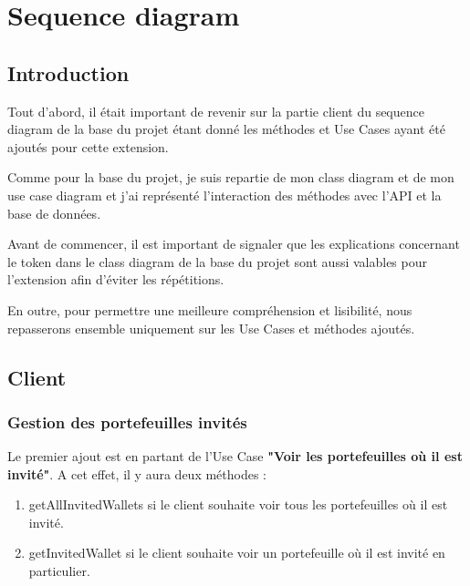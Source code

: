 \section{Sequence diagram}
\subsection{Introduction}

\begin{flushleft}
Tout d'abord, il était important de revenir sur la partie client du sequence diagram de la base du projet étant donné les méthodes et Use Cases ayant été ajoutés pour cette extension.
\end{flushleft}

\begin{flushleft}
Comme pour la base du projet, je suis repartie de mon class diagram et de mon use case diagram et j'ai représenté l'interaction des méthodes avec l'API et la base de données.
\end{flushleft}

\begin{flushleft}
Avant de commencer, il est important de signaler que les explications concernant le token dans le class diagram de la base du projet sont aussi valables pour l'extension afin d'éviter les répétitions.
\end{flushleft}

\begin{flushleft}
En outre, pour permettre une meilleure compréhension et lisibilité, nous repasserons ensemble uniquement sur les Use Cases et méthodes ajoutés.
\end{flushleft}

\newpage
\subsection{Client}
\subsubsection{Gestion des portefeuilles invités}

\begin{flushleft}
Le premier ajout est en partant de l'Use Case \textbf{"Voir les portefeuilles où il est invité"}.
A cet effet, il y aura deux méthodes :
\end{flushleft}

\begin{enumerate}
\item getAllInvitedWallets si le client souhaite voir tous les portefeuilles où il est invité.
\item getInvitedWallet si le client souhaite voir un portefeuille où il est invité en particulier.
\end{enumerate}

